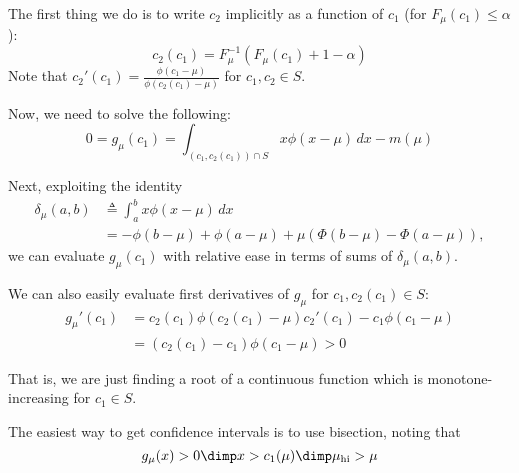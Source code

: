 \documentclass{article}
\begin{document}
The first thing we do is to write $c_2$ implicitly as a function of
$c_1$ (for $F_\mu(c_1) \leq \alpha$):
\begin{equation}
  c_2(c_1) = F_\mu^{-1}(F_\mu(c_1) + 1-\alpha)
\end{equation}
Note that $c_2'(c_1) = \frac{\phi(c_1-\mu)}{\phi(c_2(c_1)-\mu)}$ for $c_1, c_2 \in S$.

Now, we need to solve the following:
\begin{equation}
  0 = g_\mu(c_1) = \int_{(c_1,c_2(c_1)) \cap S} x \phi(x-\mu)\, dx -  m(\mu)
\end{equation}


Next, exploiting the identity
\begin{align}
  \delta_\mu(a,b) &\triangleq \int_a^b x\phi(x-\mu)\,dx \\
  &= - \phi(b-\mu) + \phi(a-\mu) +
  \mu\left(\Phi(b-\mu)-\Phi(a-\mu)\right),
\end{align}
we can evaluate $g_\mu(c_1)$ with relative ease in terms of sums of $\delta_\mu(a,b)$.

We can also easily evaluate first derivatives of $g_\mu$
for $c_1, c_2(c_1) \in S$:
\begin{align}
  g_\mu'(c_1) &= c_2(c_1) \phi(c_2(c_1) - \mu)c_2'(c_1) - c_1\phi(c_1-\mu)\\
  &= (c_2(c_1)-c_1) \phi(c_1-\mu) > 0
\end{align}

That is, we are just finding a root of a continuous function which is
monotone-increasing for $c_1\in S$.

The easiest way to get confidence intervals is to use bisection,
noting that
\begin{equation}
  g_\mu(x) > 0 \dimp x > c_1(\mu) \dimp \mu_{\text{hi}} > \mu
\end{equation}





\end{document}
